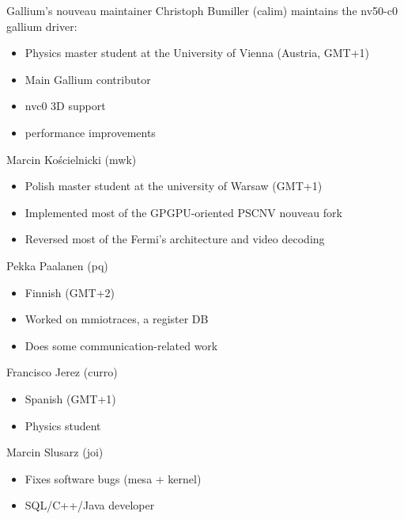 \documentclass[11pt,english,compress]{beamer}
\begin{document}
		\begin{frame}
			\begin{block}{Gallium's nouveau maintainer}
				Christoph Bumiller (calim) maintains the nv50-c0 gallium driver:
				\begin{itemize}
					\item Physics master student at the University of Vienna (Austria, GMT+1)
					\item Main Gallium contributor
					\item nvc0 3D support
					\item performance improvements
				\end{itemize}
			\end{block}

			\begin{block}{Marcin Kościelnicki (mwk)}
				\begin{itemize}
					\item Polish master student at the university of Warsaw (GMT+1)
					\item Implemented most of the GPGPU-oriented PSCNV nouveau fork
					\item Reversed most of the Fermi's architecture and video decoding
				\end{itemize}
			\end{block}
		\end{frame}

		\begin{frame}
			\begin{block}{Pekka Paalanen (pq)}
				\begin{itemize}
					\item Finnish (GMT+2)
					\item Worked on mmiotraces, a register DB
					\item Does some communication-related work
				\end{itemize}
			\end{block}

			\begin{block}{Francisco Jerez (curro)}
				\begin{itemize}
					\item Spanish (GMT+1)
					\item Physics student
				\end{itemize}
			\end{block}

			\begin{block}{Marcin Slusarz (joi)}
				\begin{itemize}
					\item Fixes software bugs (mesa + kernel)
					\item SQL/C++/Java developer
				\end{itemize}
			\end{block}
		\end{frame}
\end{document}
